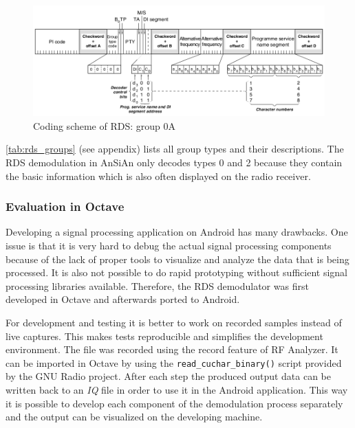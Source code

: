 \begin{figure}
	\centering
	\includegraphics[width=1\linewidth]{gfx/rds/group0A.png}
	\caption[Coding scheme of RDS: group 0A]{Coding scheme of RDS: group 0A \cite{1999:iec62106}}
	\label{fig:rds_group0A}
\end{figure}

\autoref{tab:rds_groups} (see appendix) lists all group types and their descriptions.
The \ac{RDS} demodulation in AnSiAn only decodes types 0 and 2 because they contain
the basic information which is also often displayed on the radio
receiver.


\subsubsection{Evaluation in Octave}

Developing a signal processing application on Android has many drawbacks. One
issue is that it is very hard to debug the actual signal processing components
because of the lack of proper tools to visualize and analyze the data that is
being processed. It is also not possible to do rapid prototyping without
sufficient signal processing libraries available. Therefore, the \ac{RDS}
demodulator was first developed in Octave and afterwards ported to Android.

For development and testing it is better to work on recorded samples instead
of live captures. This makes tests reproducible and simplifies the development
environment. The file was recorded using the record feature of RF Analyzer. It
can be imported in Octave by using the \texttt{read\_cuchar\_binary()} script
provided by the GNU Radio project. After each step the produced output data
can be written back to an \emph{IQ} file in order to use it in the Android application.
This way it is possible to develop each component of the demodulation process
separately and the output can be visualized on the developing machine.

